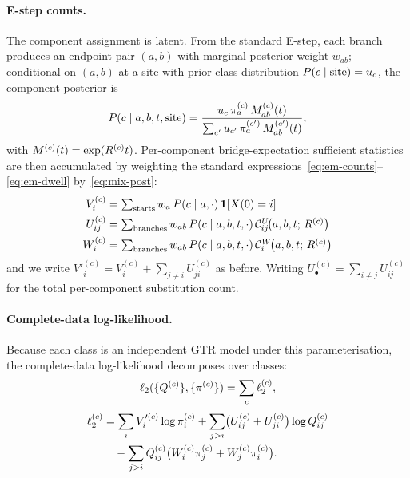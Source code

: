 \paragraph{E-step counts.}
The component assignment is latent. From the standard E-step,
each branch produces an endpoint pair $(a,b)$ with marginal posterior
weight $w_{ab}$; conditional on $(a,b)$ at a site with prior class
distribution $P(c \mid \text{site}) = u_c$, the
component posterior is
\begin{equation}\label{eq:mix-post}
P(c \mid a,b,t,\text{site})
  = \frac{u_c\,\pi^{(c)}_a\,M^{(c)}_{ab}(t)}
         {\sum_{c'} u_{c'}\,\pi^{(c')}_a\,M^{(c')}_{ab}(t)},
\end{equation}
with $M^{(c)}(t) = \exp(R^{(c)}t)$.
Per-component bridge-expectation sufficient statistics are then
accumulated by weighting the standard
expressions~\eqref{eq:em-counts}--\eqref{eq:em-dwell} by~\eqref{eq:mix-post}:
\begin{align}
V^{(c)}_i &= \textstyle\sum_{\text{starts}} w_a\,
   P(c\mid a,\cdot)\,\mathbf{1}[X(0)=i] \label{eq:mix-V}\\
U^{(c)}_{ij} &= \textstyle\sum_{\text{branches}} w_{ab}\,
   P(c\mid a,b,t,\cdot)\,
   \mathcal{C}^U_{ij}\!\bigl(a,b,t;\,R^{(c)}\bigr) \label{eq:mix-U}\\
W^{(c)}_i &= \textstyle\sum_{\text{branches}} w_{ab}\,
   P(c\mid a,b,t,\cdot)\,
   \mathcal{C}^W_i\!\bigl(a,b,t;\,R^{(c)}\bigr) \label{eq:mix-W}
\end{align}
and we write $V'^{(c)}_i = V^{(c)}_i + \sum_{j \neq i} U^{(c)}_{ji}$ as before.
Writing $U^{(c)}_\bullet = \sum_{i\neq j} U^{(c)}_{ij}$ for the
total per-component substitution count.

\paragraph{Complete-data log-likelihood.}
Because each class is an independent GTR model under this
parameterisation, the complete-data log-likelihood
decomposes over classes:
\begin{equation}\label{eq:mix-loglik}
\ell_2(\{Q^{(c)}\},\{\pi^{(c)}\}) = \sum_c \ell_2^{(c)},
\end{equation}
\begin{align}
\ell_2^{(c)}
&= \sum_i V'^{(c)}_i \log \pi^{(c)}_i
+ \sum_{j>i}\bigl(U^{(c)}_{ij}+U^{(c)}_{ji}\bigr)\log Q^{(c)}_{ij}
\notag\\
&\quad - \sum_{j>i} Q^{(c)}_{ij}
   \bigl(W^{(c)}_i \pi^{(c)}_j + W^{(c)}_j \pi^{(c)}_i\bigr).
\label{eq:mix-loglik-c}
\end{align}

